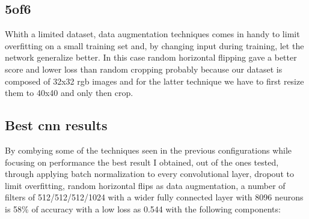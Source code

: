 \documentclass[11pt]{article}
\begin{document}
\subsection{5of6}
Whith a limited dataset, data augmentation techniques comes in handy to limit overfitting on a small training set and, by changing input during training, let the network generalize better. \newline
In this case random horizontal flipping gave a better score and lower loss than random cropping probably because our dataset is composed of 32x32 rgb images and for the latter technique we have to first resize them to 40x40 and only then crop.
\subsection{Best cnn results}
By combying some of the techniques seen in the previous configurations while focusing on performance the best result I obtained, out of the ones tested, through applying batch normalization to every convolutional layer, dropout to limit overfitting, random horizontal flips as data augmentation, a number of filters of 512/512/512/1024 with a wider fully connected layer with 8096 neurons is 58\% of accuracy with a low loss as 0.544 with the following components: \newline
\end{document}
